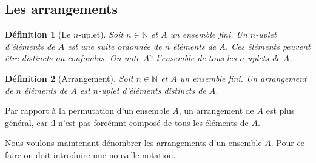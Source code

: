 \documentclass[a4paper,12pt]{book}
\renewcommand{\natural}{\mathbb{N}}
\newtheorem{definition}{Définition}
\begin{document}
\subsection{Les arrangements}

\begin{definition}[Le $n$-uplet]
Soit $n\in \natural$  et $A$ un ensemble fini. Un $n$-uplet d'éléments de $A$
est une suite ordonnée de $n$ éléments de $A$. Ces éléments peuvent être distincts 
ou confondus.
On note $A^n$ l'ensemble de tous les $n$-uplets de $A$.
\end{definition} 
\begin{definition}[Arrangement]
Soit $n\in \natural$ et $A$ un ensemble fini. Un 
arrangement de $n$ éléments de $A$
est $n$-uplet d'éléments distincts de $A$.
\end{definition} 
Par rapport à la permutation d'un ensemble $A$, un arrangement de $A$ est plus général,
car il n'est pas forcémnt composé de tous les éléments de $A$.

Nous voulons maintenant dénombrer les arrangements d'un ensemble $A$. Pour ce faire on doit
introduire une nouvelle notation. 
\end{document}
